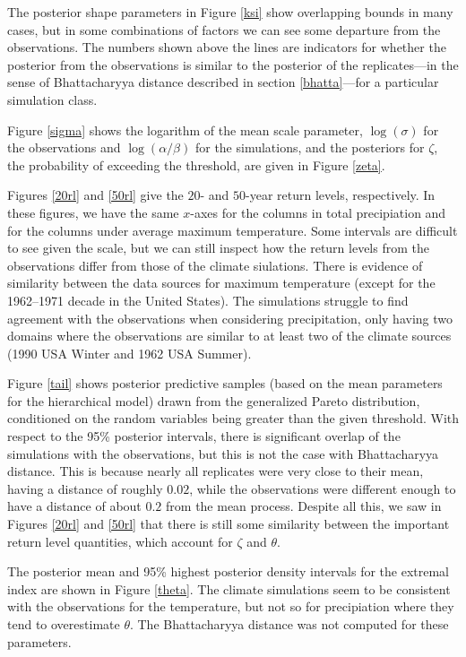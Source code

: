 The posterior shape parameters in Figure \ref{ksi} show overlapping bounds in many cases, but in some combinations of factors we can see some departure from the observations. The numbers shown above the lines are indicators for whether the posterior from the observations is similar to the posterior of the replicates---in the sense of Bhattacharyya distance described in section \ref{bhatta}---for a particular simulation class.

Figure \ref{sigma} shows the logarithm of the mean scale parameter, $\log(\sigma)$ for the observations and $\log(\alpha/\beta)$ for the simulations, and the posteriors for $\zeta$, the probability of exceeding the threshold, are given in Figure \ref{zeta}.

Figures \ref{20rl} and \ref{50rl} give the $20$- and $50$-year return levels, respectively. In these figures, we have the same $x$-axes for the columns in total precipiation and for the columns under average maximum temperature. Some intervals are difficult to see given the scale, but we can still inspect how the return levels from the observations differ from those of the climate siulations. There is evidence of similarity between the data sources for maximum temperature (except for the 1962--1971 decade in the United States). The simulations struggle to find agreement with the observations when considering precipitation, only having two domains where the observations are similar to at least two of the climate sources (1990 USA Winter and 1962 USA Summer).

Figure \ref{tail} shows posterior predictive samples (based on the mean parameters for the hierarchical model) drawn from the generalized Pareto distribution, conditioned on the random variables being greater than the given threshold. With respect to the 95\% posterior intervals, there is significant overlap of the simulations with the observations, but this is not the case with Bhattacharyya distance. This is because nearly all replicates were very close to their mean, having a distance of roughly $0.02$, while the observations were different enough to have a distance of about $0.2$ from the mean process. Despite all this, we saw in Figures \ref{20rl} and \ref{50rl} that there is still some similarity between the important return level quantities, which account for $\zeta$ and $\theta$.

The posterior mean and 95\% highest posterior density intervals for the extremal index are shown in Figure \ref{theta}. The climate simulations seem to be consistent with the observations for the temperature, but not so for precipiation where they tend to overestimate $\theta$. The Bhattacharyya distance was not computed for these parameters.
